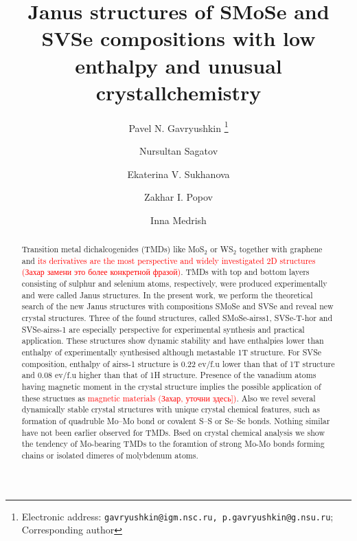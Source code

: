 \documentclass[a4paperm]{article}
\begin{document}

\title{Janus structures of SMoSe and SVSe compositions with low enthalpy and unusual crystallchemistry}


\author[1,2,3]{Pavel N. Gavryushkin
   \thanks{Electronic address: \texttt{gavryushkin@igm.nsc.ru, p.gavryushkin@g.nsu.ru}; Corresponding author}}     
\author[2]{Nursultan Sagatov}
\author[1]{Ekaterina V. Sukhanova}
\author[1]{Zakhar I. Popov}
\author[4]{Inna Medrish}



\date{}
\maketitle


\begin{abstract}
Transition metal dichalcogenides (TMDs) like MoS$_2$ or WS$_2$ together with graphene and \textcolor{red}{its derivatives are the most perspective and widely investigated 2D structures (Захар замени это более конкретной фразой)}.
TMDs with top and bottom layers consisting of sulphur and selenium atoms, respectively, were produced experimentally and were called Janus structures.
In the present work, we perform the theoretical search of the new Janus structures with compositions SMoSe and SVSe and reveal new crystal structures.
Three of the found structures, called SMoSe-airss1, SVSe-T-hor and SVSe-airss-1 are especially perspective for experimental synthesis and practical application.
These structures show dynamic stability and have enthalpies lower than enthalpy of experimentally synthesised although metastable 1T structure.
For  SVSe composition, enthalpy of airss-1 structure is 0.22 ev/f.u lower than that of 1T structure and 0.08  ev/f.u higher than that of  1H structure.
Presence of the vanadium atoms having magnetic moment in the crystal structure implies the possible application of these structues as \textcolor{red}{magnetic materials (Захар, уточни здесь])}.
Also we revel several dynamically stable crystal structures with unique crystal chemical features, such as formation of quadruble Mo--Mo bond or covalent S--S or Se--Se bonds.
Nothing similar have not been earlier observed for TMDs.
Bsed on crystal chemical analysis we show the tendency of Mo-bearing TMDs to the foramtion of strong Mo-Mo bonds forming chains or isolated  dimeres of molybdenum atoms.

\end{abstract}
\end{document}
